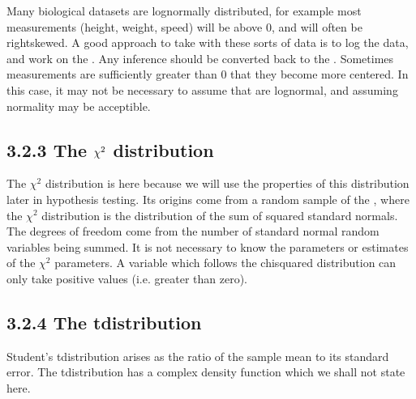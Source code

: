 \documentclass[letterpaper,10pt,english]{jupyterBook}
\begin{document}
\sphinxAtStartPar
Many biological datasets are log\sphinxhyphen{}normally distributed, for example most measurements (height, weight, speed) will be above 0, and will often be right\sphinxhyphen{}skewed. A good approach to take with these sorts of data is to log the data, and work on the . Any inference should be converted back to the . Sometimes measurements are sufficiently greater than 0 that they become more centered. In this case, it may not be necessary to assume that are log\sphinxhyphen{}normal, and assuming normality may be acceptible.


\subsection{3.2.3 The \protect\(\chi^2\protect\) distribution}
\label{\detokenize{03.c. Continuous Probability Distributions:the-chi-2-distribution}}
\sphinxAtStartPar
The \(\chi^2\) distribution is here because we will use the properties of this distribution later in hypothesis testing. Its origins come from a random sample of the , where the \(\chi^2\) distribution is the distribution of the sum of squared standard normals. The degrees of freedom come from the number of standard normal random variables being summed. It is not necessary to know the parameters or estimates of the \(\chi^2\) parameters. A variable which follows the chi\sphinxhyphen{}squared distribution can only take positive values (i.e. greater than zero).


\subsection{3.2.4 The t\sphinxhyphen{}distribution}
\label{\detokenize{03.c. Continuous Probability Distributions:the-t-distribution}}
\sphinxAtStartPar
Student’s t\sphinxhyphen{}distribution arises as the ratio of the sample mean to its standard error. The t\sphinxhyphen{}distribution has a complex density function which we shall not state here.
\end{document}
